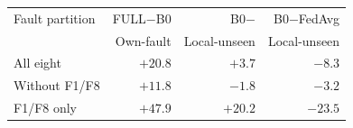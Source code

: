 \begin{tabular}{lrrr}
\toprule
Fault partition & FULL$-$B0 & B0$-$\PROTO{} & B0$-$FedAvg \\
 & Own-fault & Local-unseen & Local-unseen \\
\midrule
All eight & $+20.8$ & $+3.7$ & $-8.3$ \\
Without F1/F8 & $+11.8$ & $-1.8$ & $-3.2$ \\
F1/F8 only & $+47.9$ & $+20.2$ & $-23.5$ \\
\bottomrule
\end{tabular}
